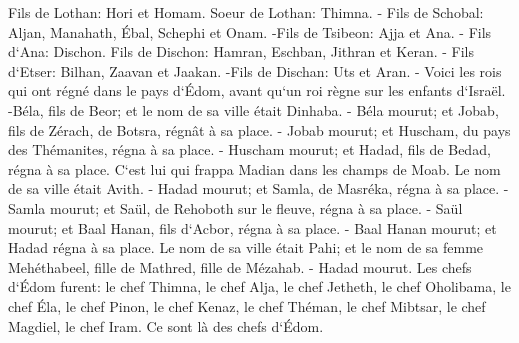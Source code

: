 \verse Fils de Lothan: Hori et Homam. Soeur de Lothan: Thimna. - 
\verse Fils de Schobal: Aljan, Manahath, Ébal, Schephi et Onam. -Fils de Tsibeon: Ajja et Ana. - 
\verse Fils d`Ana: Dischon. Fils de Dischon: Hamran, Eschban, Jithran et Keran. - 
\verse Fils d`Etser: Bilhan, Zaavan et Jaakan. -Fils de Dischan: Uts et Aran. - 
\verse Voici les rois qui ont régné dans le pays d`Édom, avant qu`un roi règne sur les enfants d`Israël. -Béla, fils de Beor; et le nom de sa ville était Dinhaba. - 
\verse Béla mourut; et Jobab, fils de Zérach, de Botsra, régnât à sa place. - 
\verse Jobab mourut; et Huscham, du pays des Thémanites, régna à sa place. - 
\verse Huscham mourut; et Hadad, fils de Bedad, régna à sa place. C`est lui qui frappa Madian dans les champs de Moab. Le nom de sa ville était Avith. - 
\verse Hadad mourut; et Samla, de Masréka, régna à sa place. - 
\verse Samla mourut; et Saül, de Rehoboth sur le fleuve, régna à sa place. - 
\verse Saül mourut; et Baal Hanan, fils d`Acbor, régna à sa place. - 
\verse Baal Hanan mourut; et Hadad régna à sa place. Le nom de sa ville était Pahi; et le nom de sa femme Mehéthabeel, fille de Mathred, fille de Mézahab. - 
\verse Hadad mourut. Les chefs d`Édom furent: le chef Thimna, le chef Alja, le chef Jetheth, 
\verse le chef Oholibama, le chef Éla, le chef Pinon, 
\verse le chef Kenaz, le chef Théman, le chef Mibtsar, 
\verse le chef Magdiel, le chef Iram. Ce sont là des chefs d`Édom. 

